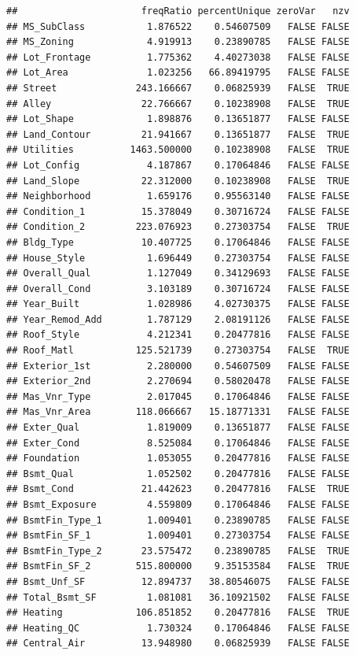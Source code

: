 \documentclass[
]{book}
\begin{document}
\begin{verbatim}
##                      freqRatio percentUnique zeroVar   nzv
## MS_SubClass           1.876522    0.54607509   FALSE FALSE
## MS_Zoning             4.919913    0.23890785   FALSE FALSE
## Lot_Frontage          1.775362    4.40273038   FALSE FALSE
## Lot_Area              1.023256   66.89419795   FALSE FALSE
## Street              243.166667    0.06825939   FALSE  TRUE
## Alley                22.766667    0.10238908   FALSE  TRUE
## Lot_Shape             1.898876    0.13651877   FALSE FALSE
## Land_Contour         21.941667    0.13651877   FALSE  TRUE
## Utilities          1463.500000    0.10238908   FALSE  TRUE
## Lot_Config            4.187867    0.17064846   FALSE FALSE
## Land_Slope           22.312000    0.10238908   FALSE  TRUE
## Neighborhood          1.659176    0.95563140   FALSE FALSE
## Condition_1          15.378049    0.30716724   FALSE FALSE
## Condition_2         223.076923    0.27303754   FALSE  TRUE
## Bldg_Type            10.407725    0.17064846   FALSE FALSE
## House_Style           1.696449    0.27303754   FALSE FALSE
## Overall_Qual          1.127049    0.34129693   FALSE FALSE
## Overall_Cond          3.103189    0.30716724   FALSE FALSE
## Year_Built            1.028986    4.02730375   FALSE FALSE
## Year_Remod_Add        1.787129    2.08191126   FALSE FALSE
## Roof_Style            4.212341    0.20477816   FALSE FALSE
## Roof_Matl           125.521739    0.27303754   FALSE  TRUE
## Exterior_1st          2.280000    0.54607509   FALSE FALSE
## Exterior_2nd          2.270694    0.58020478   FALSE FALSE
## Mas_Vnr_Type          2.017045    0.17064846   FALSE FALSE
## Mas_Vnr_Area        118.066667   15.18771331   FALSE FALSE
## Exter_Qual            1.819009    0.13651877   FALSE FALSE
## Exter_Cond            8.525084    0.17064846   FALSE FALSE
## Foundation            1.053055    0.20477816   FALSE FALSE
## Bsmt_Qual             1.052502    0.20477816   FALSE FALSE
## Bsmt_Cond            21.442623    0.20477816   FALSE  TRUE
## Bsmt_Exposure         4.559809    0.17064846   FALSE FALSE
## BsmtFin_Type_1        1.009401    0.23890785   FALSE FALSE
## BsmtFin_SF_1          1.009401    0.27303754   FALSE FALSE
## BsmtFin_Type_2       23.575472    0.23890785   FALSE  TRUE
## BsmtFin_SF_2        515.800000    9.35153584   FALSE  TRUE
## Bsmt_Unf_SF          12.894737   38.80546075   FALSE FALSE
## Total_Bsmt_SF         1.081081   36.10921502   FALSE FALSE
## Heating             106.851852    0.20477816   FALSE  TRUE
## Heating_QC            1.730324    0.17064846   FALSE FALSE
## Central_Air          13.948980    0.06825939   FALSE FALSE

\end{verbatim}
\end{document}
